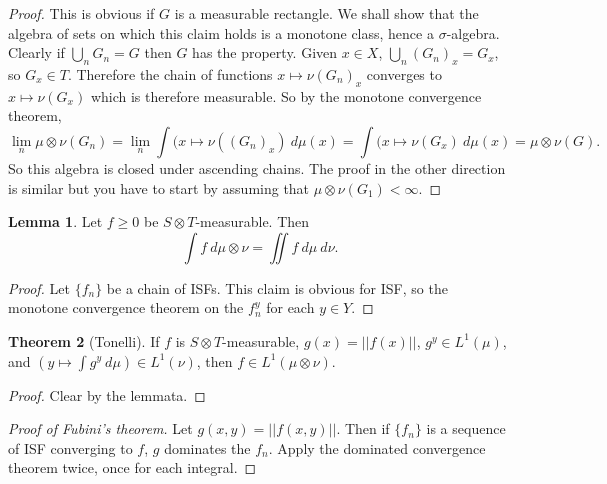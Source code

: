 \documentclass[12pt]{report}
\theoremstyle{definition}
\newtheorem{theorem}{Theorem}[chapter]
\newtheorem{lemma}[theorem]{Lemma}
\begin{document}
\begin{proof}
    This is obvious if $G$ is a measurable rectangle. We shall show that the algebra of sets on which this claim holds is a monotone class, hence a $\sigma$-algebra. Clearly if $\bigcup_n G_n = G$ then $G$ has the property. Given $x \in X$, $\bigcup_n (G_n)_x = G_x$, so $G_x \in T$. Therefore the chain of functions $x \mapsto \nu(G_n)_x$ converges to $x \mapsto \nu(G_x)$ which is therefore measurable. So by the monotone convergence theorem,
    $$\lim_n \mu \otimes \nu(G_n) = \lim_n \int (x \mapsto \nu((G_n)_x) ~d\mu(x) = \int (x \mapsto \nu(G_x) ~d\mu(x) = \mu \otimes \nu(G).$$
    So this algebra is closed under ascending chains. The proof in the other direction is similar but you have to start by assuming that $\mu \otimes \nu(G_1) < \infty$.
\end{proof}
\begin{lemma}
    Let $f \geq 0$ be $S \otimes T$-measurable. Then
    $$\int f ~d\mu \otimes \nu = \iint f ~d\mu ~d\nu.$$
\end{lemma}
\begin{proof}
    Let $\{f_n\}$ be a chain of ISFs. This claim is obvious for ISF, so the monotone convergence theorem on the $f_n^y$ for each $y \in Y$.
\end{proof}
\begin{theorem}[Tonelli]
    If $f$ is $S \otimes T$-measurable, $g(x) = ||f(x)||$, $g^y \in L^1(\mu)$, and $(y \mapsto \int g^y ~d\mu) \in L^1(\nu)$, then $f \in L^1(\mu \otimes \nu)$.
\end{theorem}
\begin{proof}
    Clear by the lemmata.
\end{proof}
\begin{proof}[Proof of Fubini's theorem]
    Let $g(x, y) = ||f(x, y)||$. Then if $\{f_n\}$ is a sequence of ISF converging to $f$, $g$ dominates the $f_n$. Apply the dominated convergence theorem twice, once for each integral.
\end{proof}
\end{document}
